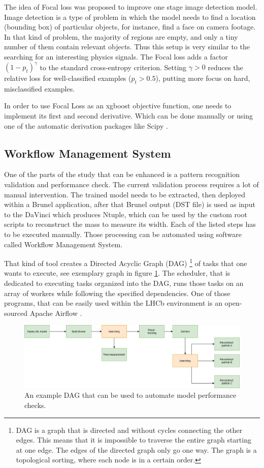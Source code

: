 The idea of Focal loss was proposed to improve one stage image detection model. Image detection is a type of problem in which the model needs to find a location (bounding box) of particular objects, for instance, find a face on camera footage. In that kind of problem, the majority of regions are empty, and only a tiny number of them contain relevant objects. Thus this setup is very similar to the searching for an interesting physics signals. The Focal loss adds a factor $(1 - p_t)^\gamma$ to the standard cross-entropy criterion. Setting $\gamma > 0$ reduces the relative loss for well-classified examples ($p_t > 0.5$), putting more focus on hard, misclassified examples.
 
In order to use Focal Loss as an xgboost objective function, one needs to implement its first and second derivative. Which can be done manually or using one of the automatic derivation packages like Scipy \cite{scipy}.   

\subsection{Workflow Management System}

One of the parts of the study that can be enhanced is a pattern recognition validation and performance check. 
The current validation process requires a lot of manual intervention. The trained model needs to be extracted, then deployed within a Brunel application, after that Brunel output (DST file) is used as input to the DaVinci which produces Ntuple, which can be used by the custom root scripts to reconstruct the mass to measure its width. Each of the listed steps has to be executed manually. Those processing can be automated using software called Workflow Management System. 

That kind of tool creates a Directed Acyclic Graph (DAG) \footnote{DAG is a graph that is directed and without cycles connecting the other edges. This means that it is impossible to traverse the entire graph starting at one edge. The edges of the directed graph only go one way. The graph is a topological sorting, where each node is in a certain order.} of tasks that one wants to execute, see exemplary graph in figure \ref{fig:DAG}. The scheduler, that is dedicated to executing tasks organized into the DAG, runs those tasks on an array of workers while following the specified dependencies. One of those programs, that can be easily used within the LHCb environment is an open-sourced Apache Airflow \cite{airflow}.


\begin{figure}[!h]
\centering
\includegraphics[scale=0.8]{figures/Upgrade_wokflow.png}
\caption{An example DAG that can be used to automate model performance checks. 
\label{fig:DAG}}
\end{figure}